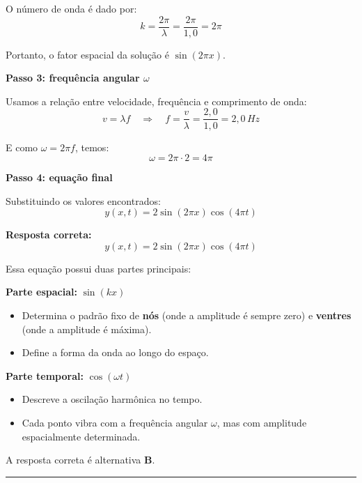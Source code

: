 \documentclass[a4paper,12pt]{article}
\begin{document}
\begin{flushleft}
O número de onda é dado por:
\[
k = \frac{2\pi}{\lambda} = \frac{2\pi}{1,0} = 2\pi
\]

Portanto, o fator espacial da solução é \(\sin(2\pi x)\).

\bigskip

\textbf{Passo 3: frequência angular \(\omega\)}

Usamos a relação entre velocidade, frequência e comprimento de onda:
\[
v = \lambda f \quad \Longrightarrow \quad f = \frac{v}{\lambda} = \frac{2,0}{1,0} = 2,0\,Hz
\]

E como \(\omega = 2\pi f\), temos:
\[
\omega = 2\pi \cdot 2 = 4\pi
\]

\bigskip

\textbf{Passo 4: equação final}

Substituindo os valores encontrados:
\[
y(x,t) = 2 \sin(2\pi x) \cos(4\pi t)
\]

\bigskip

\textbf{Resposta correta:}
\[
\boxed{y(x,t) = 2 \sin(2\pi x) \cos(4\pi t)}
\]

Essa equação possui duas partes principais:

\bigskip

\textbf{Parte espacial:} \(\sin(kx)\)
\begin{itemize}
    \item Determina o padrão fixo de \textbf{nós} (onde a amplitude é sempre zero) e \textbf{ventres} (onde a amplitude é máxima).
    \item Define a forma da onda ao longo do espaço.
\end{itemize}

\bigskip

\textbf{Parte temporal:} \(\cos(\omega t)\)
\begin{itemize}
    \item Descreve a oscilação harmônica no tempo.
    \item Cada ponto vibra com a frequência angular \(\omega\), mas com amplitude espacialmente determinada.
\end{itemize}


A resposta correta é alternativa \colorbox{green!50}{\textbf{B}}.
\end{flushleft}

\noindent\rule{\linewidth}{0.6pt}\\
\end{document}
